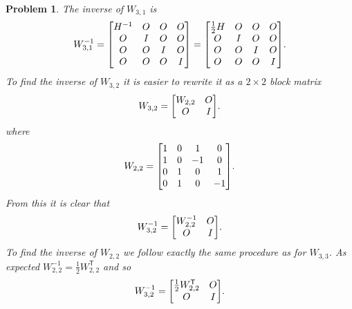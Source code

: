\documentclass{article}
\newcommand{\T}{\mathsf{T}}
\theoremstyle{pprop}
\newtheorem{problem}{Problem}[section]
\begin{document}
\begin{problem}
The inverse of $W_{3,1}$ is 
\[
W_{3,1}^{-1}=
\mqty[H^{-1} & O & O & O \\ O & I & O & O \\ O & O & I & O \\ O & O & O & I]=
\mqty[\frac12H & O & O & O \\ O & I & O & O \\ O & O & I & O \\ O & O & O & I].
\]
To find the inverse of $W_{3,2}$ it is easier to rewrite it as a $2 \times 2$ block matrix 
\[
W_{3,2}= \mqty[ W_{2,2} & O \\ O & I].
\]
where 
\[
W_{2,2} = \mqty[1 & 0 & 1 & 0 \\ 1 & 0 & -1 & 0 \\ 0 & 1 & 0 & 1 \\ 0 & 1 & 0 & -1].
\]
From this it is clear that 
\[
W_{3,2}^{-1}= \mqty[ W_{2,2}^{-1} & O \\ O & I].
\]
To find the inverse of $W_{2,2}$ we follow exactly the same procedure as for $W_{3,3}$.
As expected $W_{2,2}^{-1}=\frac12W_{2,2}^\T$ and so 
\[
W_{3,2}^{-1}= \mqty[ \frac12 W_{2,2}^\T & O \\ O & I].
\]
\end{problem}
\end{document}
